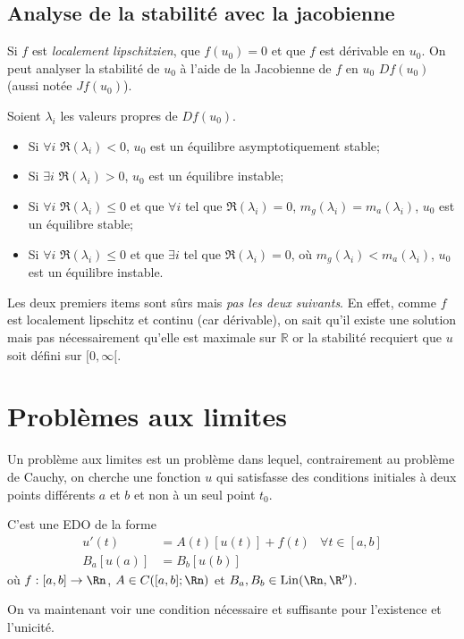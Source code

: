 \subsection{Analyse de la stabilité avec la jacobienne}
Si $f$ est \emph{localement lipschitzien},
que $f(u_0) = 0$ et que $f$ est dérivable
en $u_0$.
On peut analyser la stabilité de $u_0$ à l'aide de la Jacobienne de $f$
en $u_0$ $Df(u_0)$ (aussi notée $Jf(u_0)$).

Soient $\lambda_i$ les valeurs propres de $Df(u_0)$.
\begin{itemize}
  \item Si $\forall i$ $\Re(\lambda_i) < 0$, $u_0$
    est un équilibre asymptotiquement stable;
  \item Si $\exists i$ $\Re(\lambda_i) > 0$, $u_0$
    est un équilibre instable;
  \item Si $\forall i$ $\Re(\lambda_i) \leq 0$ et que $\forall i$ tel que
    $\Re(\lambda_i) = 0$, $m_g(\lambda_i) = m_a(\lambda_i)$,
    $u_0$ est un équilibre stable;
  \item Si $\forall i$ $\Re(\lambda_i) \leq 0$ et que $\exists i$ tel que
    $\Re(\lambda_i) = 0$, où $m_g(\lambda_i) < m_a(\lambda_i)$,
    $u_0$ est un équilibre instable.
\end{itemize}

Les deux premiers items sont sûrs mais \emph{pas les deux suivants}.
En effet, comme $f$ est localement lipschitz et continu (car dérivable),
on sait qu'il existe une solution mais pas nécessairement qu'elle est maximale
sur $\mathbb{R}$ or la stabilité recquiert
que $u$ soit défini sur $[0,\infty[$.

\section{Problèmes aux limites}
Un problème aux limites est un problème dans lequel,
contrairement au problème de Cauchy,
on cherche une fonction $u$ qui satisfasse des conditions initiales
à deux points différents $a$ et $b$ et non à un seul point $t_0$.

C'est une EDO de la forme
\begin{align*}
  u'(t) & = A(t)[u(t)] + f(t) & \forall t \in [a,b]\\
  B_a[u(a)] & = B_b[u(b)]
\end{align*}
où $f:[a,b]\to\Rn$, $A \in C([a,b];\Rn)$ et $B_a,B_b \in \lin(\Rn,\R^p)$.

On va maintenant voir une condition nécessaire et suffisante pour
l'existence et l'unicité.
